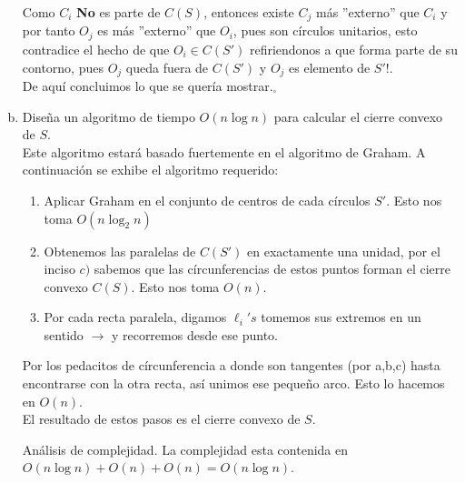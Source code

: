 \begin{enumerate}[a)]
Como $C_i$ \textbf{No} es parte de $C(S)$, entonces existe $C_j$ más ''externo'' que 
$C_i$ y por tanto $O_j$ es más ''externo'' que $O_i$, pues son círculos unitarios, 
esto contradice el hecho de que $O_i\in C(S')$ refiriendonos a que forma parte de su 
contorno, pues $O_j$ queda fuera de $C(S')$ y $O_j$ es elemento de $S'!$.\\

De aquí concluimos lo que se quería mostrar.$_\square$
 \item Diseña un algoritmo de tiempo $O(n \log n)$ para calcular el cierre convexo de $S$.\\
 Este algoritmo estará basado fuertemente en el algoritmo de Graham. A continuación
 se exhibe el algoritmo requerido:
 \begin{enumerate}[1.]
     \item Aplicar Graham en el conjunto de centros de cada círculos $S'$. Esto nos
     toma $O(n \log_2 n)$
     \item Obtenemos las paralelas de $C(S')$ en exactamente una unidad, por el
     inciso  $c)$ sabemos que las círcunferencias de estos puntos forman el cierre
     convexo $C(S)$. Esto nos toma $O(n)$.
     \item Por cada recta paralela, digamos $\ell_{i} 's$ tomemos sus extremos en un
     sentido $\rightarrow$ y recorremos desde ese punto.
 \end{enumerate}

Por los pedacitos de círcunferencia a donde son tangentes (por a,b,c) hasta encontrarse
con la otra recta, así unimos ese pequeño arco. Esto lo hacemos en $O(n)$.\\

El resultado de estos pasos es el cierre convexo de $S$.

Análisis de complejidad. La complejidad esta contenida en 
$O(n \log n) + O(n) + O(n) = O(n \log n)$.
\end{enumerate}